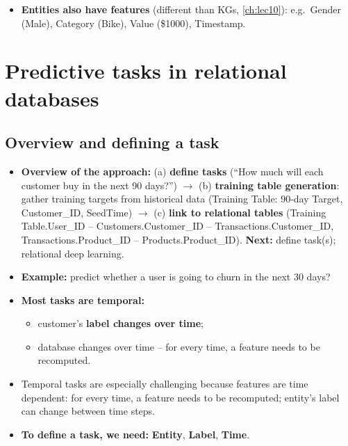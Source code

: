 \begin{itemize}
  \item \textbf{Entities also have features} (different than KGs, \cref{ch:lec10}): e.g.\
    Gender (Male), Category (Bike), Value (\$1000), Timestamp.
\end{itemize}

\section{Predictive tasks in relational databases}\label{sec:lec12-predtasks}

\subsection{Overview and defining a task}\label{sec:lec12-define}
\slides{41--42}

\begin{itemize}
  \item \textbf{Overview of the approach:} (a) \textbf{define tasks} (``How much will each
    customer buy in the next 90 days?'') $\to$ (b) \textbf{training table generation}:
    gather training targets from historical data (Training Table: 90-day Target,
    Customer\_ID, SeedTime) $\to$ (c) \textbf{link to relational tables} (Training
    Table.User\_ID -- Customers.Customer\_ID -- Transactions.Customer\_ID,
    Transactions.Product\_ID -- Products.Product\_ID).
    \textbf{Next:} define task(s); relational deep learning.
  \item \textbf{Example:} predict whether a user is going to churn in the next 30 days?
  \item \textbf{Most tasks are temporal:}
    \begin{itemize}
      \item customer's \textbf{label changes over time};
      \item database changes over time -- for every time, a feature needs to be
        recomputed.
    \end{itemize}
  \item Temporal tasks are especially challenging because features are time dependent:
    for every time, a feature needs to be recomputed; entity's label can change between
    time steps.
  \item \textbf{To define a task, we need:} \textbf{Entity}, \textbf{Label},
    \textbf{Time}.
\end{itemize}

